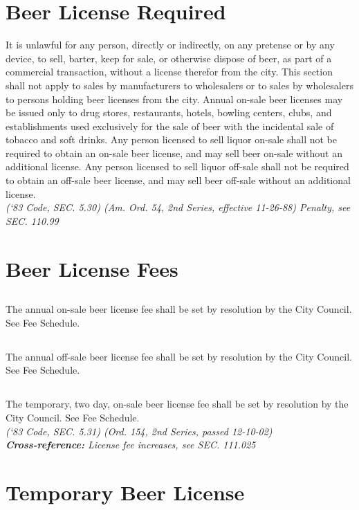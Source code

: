 \section{Beer License Required}
It is unlawful for any person, directly or indirectly, on any pretense or by any device, to sell, barter, keep for sale, or otherwise dispose of beer, as part of a commercial transaction, without a license therefor from the city. This section shall not apply to sales by manufacturers to wholesalers or to sales by wholesalers to persons holding beer licenses from the city.  Annual on-sale beer licenses may be issued only to drug stores, restaurants, hotels, bowling centers, clubs, and establishments used exclusively for the sale of beer with the incidental sale of tobacco and soft drinks.  Any person licensed to sell liquor on-sale shall not be required to obtain an on-sale beer license, and may sell beer on-sale without an additional license.  Any person licensed to sell liquor off-sale shall not be required to obtain an off-sale beer license, and may sell beer off-sale without an additional license.\\
\emph{(‘83 Code, SEC. 5.30)  (Am. Ord. 54, 2nd Series, effective 11-26-88)  Penalty, see SEC. 110.99}
\section{Beer License Fees}
\subsection{}
The annual on-sale beer license fee shall be set by resolution by the City Council. See Fee Schedule.
\subsection{}
The annual off-sale beer license fee shall be set by resolution by the City Council. See Fee Schedule.
\subsection{}
The temporary, two day, on-sale beer license fee shall be set by resolution by the City Council. See Fee Schedule.\\
\emph{(‘83 Code, SEC. 5.31)  (Ord. 154, 2nd Series, passed 12-10-02)}\\
\emph{\textbf{Cross-reference:} License fee increases, see SEC. 111.025}
\section{Temporary Beer License}
